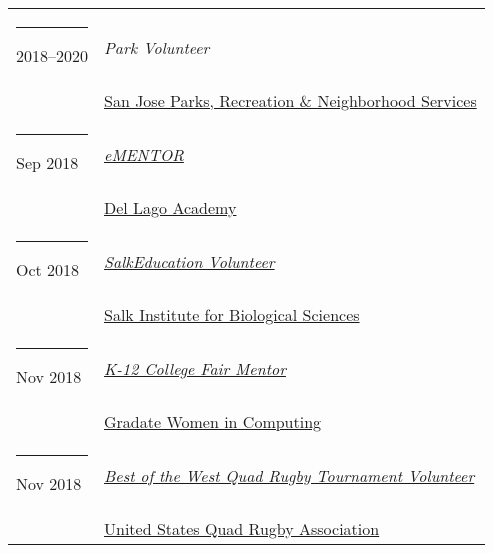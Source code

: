 \documentclass[margin,line]{res}
\begin{document}
\begin{resume}
\begin{longtable}{@{}p{0.7in}p{4in}}
\hspace*{-4mm} \rule{-1mm}{5mm} 2018--2020 & \textit{Park Volunteer}\\*
\hspace*{-4mm} & \hspace{4mm} \href{https://www.sanjoseca.gov/prns/}{San Jose Parks, Recreation \& Neighborhood Services}\\

\hspace*{-4mm} \rule{-1mm}{5mm} Sep 2018 & \href{https://www.dellagoacademy.org/apps/pages/index.jsp?uREC_ID=1248617&type=d&pREC_ID=1474743}{\textit{eMENTOR}}\\*
\hspace*{-4mm} & \hspace{4mm} \href{https://www.dellagoacademy.org/}{Del Lago Academy}\\

\hspace*{-4mm} \rule{-1mm}{5mm} Oct 2018 & \href{https://www.salk.edu/about/education-outreach/}{\textit{SalkEducation Volunteer}}\\*
\hspace*{-4mm} & \hspace{4mm} \href{https://www.salk.edu/}{Salk Institute for Biological Sciences}\\

\hspace*{-4mm} \rule{-1mm}{5mm} Nov 2018 & \href{https://gradwic.ucsd.edu/}{\textit{K-12 College Fair Mentor}}\\*
\hspace*{-4mm} & \hspace{4mm} \href{https://gradwic.ucsd.edu///}{Gradate Women in Computing}\\

\hspace*{-4mm} \rule{-1mm}{5mm} Nov 2018 & \href{http://www.quadrugby.com/node/2348/}{\textit{Best of the West Quad Rugby Tournament Volunteer}}\\*
\hspace*{-4mm} & \hspace{4mm} \href{http://www.quadrugby.com/node/2348///}{United States Quad Rugby Association}\\

\end{longtable}

\end{resume}
\end{document}
